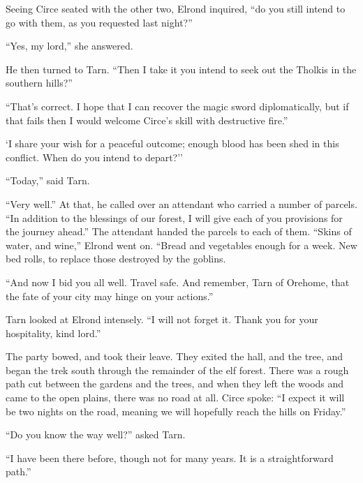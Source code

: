 Seeing Circe seated with the other two, Elrond inquired, ``do you still intend to go with them, as you requested last night?''

``Yes, my lord,'' she answered.

He then turned to Tarn.  ``Then I take it you intend to seek out the Tholkis in the southern hills?''

``That's correct.  I hope that I can recover the magic sword diplomatically, but if that fails then I would welcome Circe's skill with destructive fire.''

`I share your wish for a peaceful outcome; enough blood has been shed in this conflict.  When do you intend to depart?''

``Today,'' said Tarn.

``Very well.''  At that, he called over an attendant who carried a number of parcels.  ``In addition to the blessings of our forest, I will give each of you provisions for the journey ahead.''  The attendant handed the parcels to each of them.  ``Skins of water, and wine,'' Elrond went on.  ``Bread and vegetables enough for a week.  New bed rolls, to replace those destroyed by the goblins.

``And now I bid you all well.  Travel safe.  And remember, Tarn of Orehome, that the fate of your city may hinge on your actions.''

Tarn looked at Elrond intensely.  ``I will not forget it.  Thank you for your hospitality, kind lord.''

The party bowed, and took their leave.  They exited the hall, and the tree, and began the trek south through the remainder of the elf forest.  There was a rough path cut between the gardens and the trees, and when they left the woods and came to the open plains, there was no road at all.  Circe spoke: ``I expect it will be two nights on the road, meaning we will hopefully reach the hills on Friday.''

``Do you know the way well?'' asked Tarn.

``I have been there before, though not for many years.  It is a straightforward path.''


